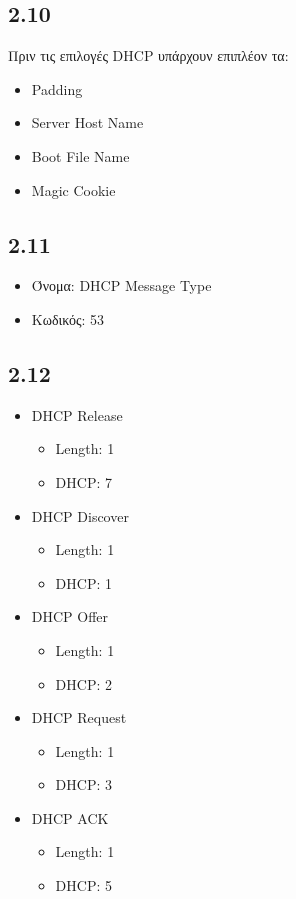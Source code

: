 		\subsection*{2.10}
			Πριν τις επιλογές DHCP υπάρχουν επιπλέον τα:
			 
			\begin{itemize}
				\item Padding
				\item Server Host Name
				\item Boot File Name
				\item Magic Cookie
			\end{itemize}

		\subsection*{2.11}
			\begin{itemize}
				\item Όνομα: DHCP Message Type
				\item Κωδικός: 53
			\end{itemize}

		\subsection*{2.12}
			\begin{itemize}
				\item DHCP Release
					\begin{itemize}
						\item Length: 1
						\item DHCP: 7
					\end{itemize}
				\item DHCP Discover
					\begin{itemize}
						\item Length: 1 
						\item DHCP: 1
					\end{itemize}
				\item DHCP Offer
					\begin{itemize}
						\item Length: 1
						\item DHCP: 2
					\end{itemize}
				\item DHCP Request
					\begin{itemize}
						\item Length: 1
						\item DHCP: 3
					\end{itemize}
				\item DHCP ACK 
					\begin{itemize}
						\item Length: 1
						\item DHCP: 5
					\end{itemize}
			\end{itemize}


